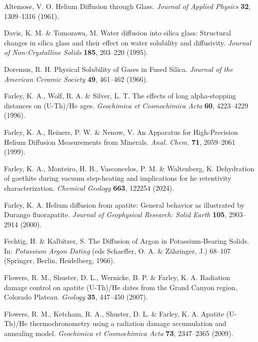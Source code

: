 \documentclass[gchron, manuscript]{copernicus}
\begin{document}
\begin{thebibliography}{}

Altemose, V. O. Helium Diffusion through Glass. \emph{Journal of Applied Physics} \textbf{32}, 1309--1316 (1961).

Davis, K. M. \& Tomozawa, M. Water diffusion into silica glass: Structural changes in silica glass and their effect on water solubility and diffusivity. \emph{Journal of Non-Crystalline Solids} \textbf{185}, 203--220 (1995).

Doremus, R. H. Physical Solubility of Gases in Fused Silica. \emph{Journal of the American Ceramic Society} \textbf{49}, 461--462 (1966).

Farley, K. A., Wolf, R. A. \& Silver, L. T. The effects of long alpha-stopping distances on (U-Th)/He ages. \emph{Geochimica et Cosmochimica Acta} \textbf{60}, 4223--4229 (1996).

Farley, K. A., Reiners, P. W. \& Nenow, V. An Apparatus for High-Precision Helium Diffusion Measurements from Minerals. \emph{Anal. Chem.} \textbf{71}, 2059--2061 (1999).

Farley, K. A., Monteiro, H. B., Vasconcelos, P. M. \& Waltenberg, K. Dehydration of goethite during vacuum step-heating and implications for he retentivity characterization. \emph{Chemical Geology} \textbf{663}, 122254 (2024).

Farley, K. A. Helium diffusion from apatite: General behavior as illustrated by Durango fluorapatite. \emph{Journal of Geophysical Research: Solid Earth} \textbf{105}, 2903--2914 (2000).

Fechtig, H. \& Kalbitzer, S. The Diffusion of Argon in Potassium-Bearing Solids. In: \emph{Potassium Argon Dating} (eds Schaeffer, O. A. \& Z\"ahringer, J.) 68--107 (Springer, Berlin, Heidelberg, 1966).

Flowers, R. M., Shuster, D. L., Wernicke, B. P. \& Farley, K. A. Radiation damage control on apatite (U-Th)/He dates from the Grand Canyon region, Colorado Plateau. \emph{Geology} \textbf{35}, 447--450 (2007).

Flowers, R. M., Ketcham, R. A., Shuster, D. L. \& Farley, K. A. Apatite (U-Th)/He thermochronometry using a radiation damage accumulation and annealing model. \emph{Geochimica et Cosmochimica Acta} \textbf{73}, 2347--2365 (2009).


\end{thebibliography}
\end{document}
